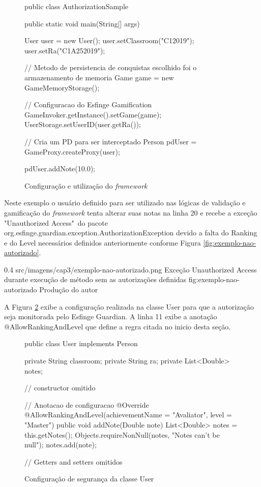 \begin{figure}[H]
    \centering
    \caption{Configuração e utilização do \textit{framework}}
    \begin{java}
public class AuthorizationSample {

	public static void main(String[] args) {

		User user = new User();
		user.setClassroom("C12019");
		user.setRa("C1A252019");
		
		// Metodo de persistencia de conquistas escolhido foi o armazenamento de memoria
		Game game = new GameMemoryStorage();

		// Configuracao do Esfinge Gamification
		GameInvoker.getInstance().setGame(game);
		UserStorage.setUserID(user.getRa());

		// Cria um PD para ser interceptado
		Person pdUser = GameProxy.createProxy(user);

		pdUser.addNote(10.0);

	}
}
    \end{java}
    \label{fig:hellow-world-gamification}
\end{figure}

\par Neste exemplo o usuário definido para ser utilizado nas lógicas de validação e gamificação do \textit{framework} tenta alterar suas notas na linha 20 e recebe a exceção "Unauthorized Access"\ do pacote org.esfinge.guardian.exception.AuthorizationException devido a falta do Ranking e do Level necessários definidos anteriormente conforme Figura \ref{fig:exemplo-nao-autorizado}.

\begin{image}
{0.4}
{src/imagens/cap3/exemplo-nao-autorizado.png}
{Exceção Unauthorized Access durante execução de método sem as autorizações definidas}
{fig:exemplo-nao-autorizado}
{Produção do autor}
\end{image}

\par A Figura \ref{fig:execao-configuracao} exibe a configuração realizada na classe User para que a autorização seja monitorada pelo Esfinge Guardian. A linha 11 exibe a anotação @AllowRankingAndLevel que define a regra citada no inicio desta seção.

\begin{figure}[H]
    \centering
    \caption{Configuração de segurança da classe User}
    \begin{java}
public class User implements Person {

	private String classroom;
	private String ra;
	private List<Double> notes;

// constructor omitido
    
// Anotacao de configuracao
        @Override
	@AllowRankingAndLevel(achievementName = "Avaliator", level = "Master")
	public void addNote(Double note) {
		List<Double> notes = this.getNotes();
		Objects.requireNonNull(notes, "Notes can't be null");
		notes.add(note);
	}
	
// Getters and setters omitidos
}
    \end{java}
    \label{fig:execao-configuracao}
\end{figure}

